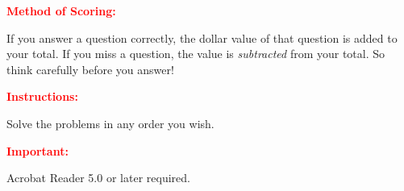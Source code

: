 \documentclass[dvips]{jj_game} %
\begin{document}
\begin{instructions}

\vspace*{12pt}

\textcolor{red}{\bfseries Method of Scoring:}

If you answer a question correctly, the dollar value of that
question is added to your total.  If you miss a question, the value
is {\it subtracted\/} from your total.  So think carefully before
you answer!

\textcolor{red}{\textbf{Instructions:}}

Solve the problems in
any order you wish.

\textcolor{red}{\textbf{Important:}}

Acrobat Reader 5.0 or later required.

\begin{center}
\end{center}

\end{instructions}

\end{document}
